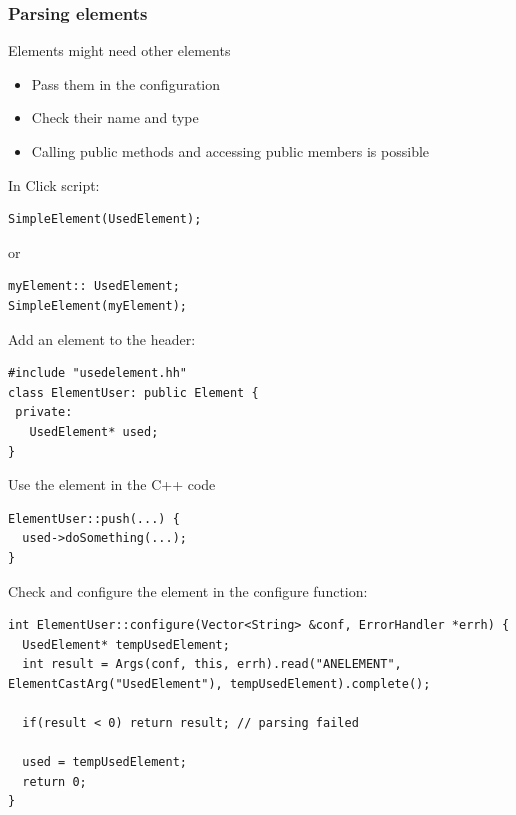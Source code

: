 \documentclass{beamer}
\begin{document}
\begin{frame}
\frametitle{Parsing elements}
Elements might need other elements
\begin{itemize}
	\item Pass them in the configuration
	\item Check their name and type
	\item Calling public methods and accessing public members is possible
\end{itemize}
In Click script: 
\begin{lstlisting}
SimpleElement(UsedElement);
\end{lstlisting}
or
\begin{lstlisting}
myElement:: UsedElement;
SimpleElement(myElement);
\end{lstlisting}

Add an element to the header:
\begin{lstlisting}
#include "usedelement.hh"
class ElementUser: public Element {
 private: 
   UsedElement* used;
}
\end{lstlisting}

Use the element in the C++ code
\begin{lstlisting}
ElementUser::push(...) {
  used->doSomething(...);
}
\end{lstlisting}

\framebreak

Check and configure the element in the configure function:
%  
%  

\begin{lstlisting}
int ElementUser::configure(Vector<String> &conf, ErrorHandler *errh) {
  UsedElement* tempUsedElement;
  int result = Args(conf, this, errh).read("ANELEMENT", ElementCastArg("UsedElement"), tempUsedElement).complete();
  
  if(result < 0) return result; // parsing failed
  
  used = tempUsedElement;
  return 0;
}

\end{lstlisting}
\end{frame}
\end{document}
